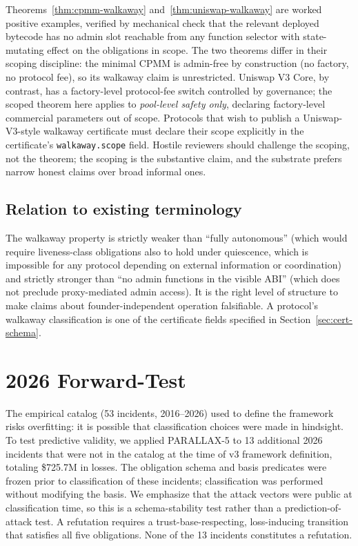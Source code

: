 \documentclass[11pt,a4paper]{article}
\begin{document}
Theorems~\ref{thm:cpmm-walkaway} and~\ref{thm:uniswap-walkaway} are worked positive examples, verified by mechanical check that the relevant deployed bytecode has no admin slot reachable from any function selector with state-mutating effect on the obligations in scope. The two theorems differ in their scoping discipline: the minimal CPMM is admin-free by construction (no factory, no protocol fee), so its walkaway claim is unrestricted. Uniswap V3 Core, by contrast, has a factory-level protocol-fee switch controlled by governance; the scoped theorem here applies to \emph{pool-level safety only}, declaring factory-level commercial parameters out of scope. Protocols that wish to publish a Uniswap-V3-style walkaway certificate must declare their scope explicitly in the certificate's \texttt{walkaway.scope} field. Hostile reviewers should challenge the scoping, not the theorem; the scoping is the substantive claim, and the substrate prefers narrow honest claims over broad informal ones.

\subsection{Relation to existing terminology}

The walkaway property is strictly weaker than ``fully autonomous'' (which would require liveness-class obligations also to hold under quiescence, which is impossible for any protocol depending on external information or coordination) and strictly stronger than ``no admin functions in the visible ABI'' (which does not preclude proxy-mediated admin access). It is the right level of structure to make claims about founder-independent operation falsifiable. A protocol's walkaway classification is one of the certificate fields specified in Section~\ref{sec:cert-schema}.

\section{2026 Forward-Test}\label{sec:forward-test}

The empirical catalog (53 incidents, 2016--2026) used to define the framework risks overfitting: it is possible that classification choices were made in hindsight. To test predictive validity, we applied PARALLAX-5 to 13 additional 2026 incidents that were not in the catalog at the time of v3 framework definition, totaling \$725.7M in losses. The obligation schema and basis predicates were frozen prior to classification of these incidents; classification was performed without modifying the basis. We emphasize that the attack vectors were public at classification time, so this is a schema-stability test rather than a prediction-of-attack test. A refutation requires a trust-base-respecting, loss-inducing transition that satisfies all five obligations. None of the 13 incidents constitutes a refutation.
\end{document}
